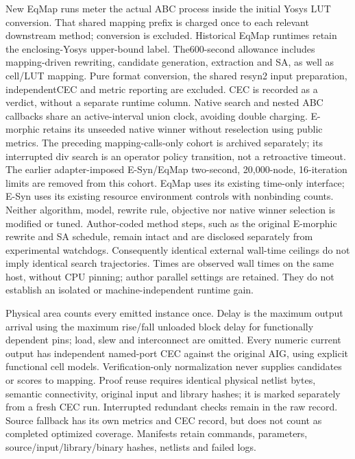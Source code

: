 \documentclass[conference]{IEEEtran}
\begin{document}
New EqMap runs meter the actual ABC process inside the initial Yosys LUT conversion. That shared mapping prefix is charged once to each relevant downstream method; conversion is excluded.
Historical EqMap runtimes retain the enclosing-Yosys upper-bound label.
The600-second allowance includes mapping-driven rewriting, candidate generation, extraction and SA, as well as cell/LUT mapping. Pure format conversion, the shared resyn2 input preparation, independentCEC and metric reporting are excluded. CEC is recorded as a verdict, without a separate runtime column. Native search and nested ABC callbacks share an active-interval union clock, avoiding double charging. E-morphic retains its unseeded native winner without reselection using public metrics. The preceding mapping-calls-only cohort is archived separately; its interrupted div search is an operator policy transition, not a retroactive timeout.
The earlier adapter-imposed E-Syn/EqMap two-second, 20,000-node, 16-iteration limits are removed from this cohort. EqMap uses its existing time-only interface; E-Syn uses its existing resource environment controls with nonbinding counts. Neither algorithm, model, rewrite rule, objective nor native winner selection is modified or tuned. Author-coded method steps, such as the original E-morphic rewrite and SA schedule, remain intact and are disclosed separately from experimental watchdogs. Consequently identical external wall-time ceilings do not imply identical search trajectories.
Times are observed wall times on the same host, without CPU pinning; author parallel settings are retained. They do not establish an isolated or machine-independent runtime gain.

Physical area counts every emitted instance once. Delay is the maximum output arrival using the maximum rise/fall unloaded block delay for functionally dependent pins; load, slew and interconnect are omitted.
Every numeric current output has independent named-port CEC against the original AIG, using explicit functional cell models.
Verification-only normalization never supplies candidates or scores to mapping.
Proof reuse requires identical physical netlist bytes, semantic connectivity, original input and library hashes; it is marked separately from a fresh CEC run. Interrupted redundant checks remain in the raw record.
Source fallback has its own metrics and CEC record, but does not count as completed optimized coverage.
Manifests retain commands, parameters, source/input/library/binary hashes, netlists and failed logs.
\end{document}
